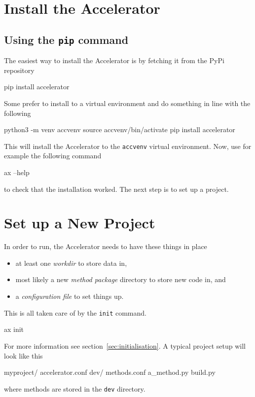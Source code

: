 
\section{Install the Accelerator}

\subsection{Using the \texttt{pip} command}
The easiest way to install the Accelerator is by fetching it from the
PyPi repository
\begin{shell}
pip install accelerator
\end{shell}
Some prefer to install to a virtual environment and do something in
line with the following
\begin{shell}
python3 -m venv accvenv
source accvenv/bin/activate
pip install accelerator
\end{shell}
This will install the Accelerator to the \texttt{accvenv} virtual
environment.  Now, use for example the following command
\begin{shell}
ax --help
\end{shell}
to check that the installation worked.  The next step is to set up a
project.



\section{Set up a New Project}
In order to run, the Accelerator needs to have these things in place
\begin{itemize}
\item[] at least one \textsl{workdir} to store data in,
\item[] most likely a new \textsl{method package} directory to store new code in, and
\item[] a \textsl{configuration file} to set things up.
\end{itemize}
This is all taken care of by the \texttt{init} command.
\begin{shell}
ax init
\end{shell}
For more information see section~\ref{sec:initialisation}.  A typical
project setup will look like this
\begin{shell}
myproject/
    accelerator.conf
    dev/
        methods.conf
        a_method.py
        build.py
\end{shell}
where methods are stored in the \texttt{dev} directory.



